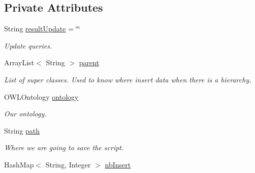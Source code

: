 \subsection*{Private Attributes}
\begin{DoxyCompactItemize}
\item 
\hypertarget{class_data_base_1_1_individuals_a63431168f0f3597b37b963db4674f90b}{
String \hyperlink{class_data_base_1_1_individuals_a63431168f0f3597b37b963db4674f90b}{resultUpdate} = \char`\"{}\char`\"{}}
\label{class_data_base_1_1_individuals_a63431168f0f3597b37b963db4674f90b}

\begin{DoxyCompactList}\small\item\em Update queries. \end{DoxyCompactList}\item 
\hypertarget{class_data_base_1_1_individuals_a67489fb359e36b64fc5621616c87c6f7}{
ArrayList$<$ String $>$ \hyperlink{class_data_base_1_1_individuals_a67489fb359e36b64fc5621616c87c6f7}{parent}}
\label{class_data_base_1_1_individuals_a67489fb359e36b64fc5621616c87c6f7}

\begin{DoxyCompactList}\small\item\em List of super classes.  Used to know where insert data when there is a hierarchy. \end{DoxyCompactList}\item 
\hypertarget{class_data_base_1_1_individuals_a9c58b63ea5106f271a3b522c6fdc30d7}{
OWLOntology \hyperlink{class_data_base_1_1_individuals_a9c58b63ea5106f271a3b522c6fdc30d7}{ontology}}
\label{class_data_base_1_1_individuals_a9c58b63ea5106f271a3b522c6fdc30d7}

\begin{DoxyCompactList}\small\item\em Our ontology. \end{DoxyCompactList}\item 
\hypertarget{class_data_base_1_1_individuals_a9d3ee042e0b9f2f2889ed6258a9b4e62}{
String \hyperlink{class_data_base_1_1_individuals_a9d3ee042e0b9f2f2889ed6258a9b4e62}{path}}
\label{class_data_base_1_1_individuals_a9d3ee042e0b9f2f2889ed6258a9b4e62}

\begin{DoxyCompactList}\small\item\em Where we are going to save the script. \end{DoxyCompactList}\item 
\hypertarget{class_data_base_1_1_individuals_af8121a67fea7d2d61877cdcc3f5143aa}{
HashMap$<$ String, Integer $>$ \hyperlink{class_data_base_1_1_individuals_af8121a67fea7d2d61877cdcc3f5143aa}{nbInsert}}
\label{class_data_base_1_1_individuals_af8121a67fea7d2d61877cdcc3f5143aa}


\end{DoxyCompactItemize}
